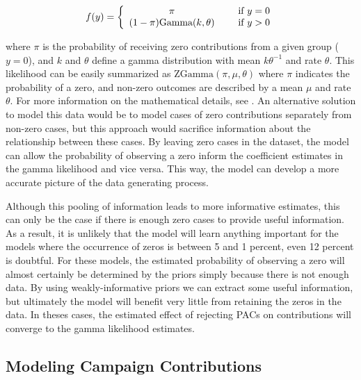 \documentclass[12pt]{article}
\begin{document}
  \begin{align}
f(y) = \left\{ \begin{array}{cc} 
                \pi & \hspace{5mm} \text{if $y = 0$} \\
                (1 - \pi) \text{Gamma}(k, \theta) & \hspace{5mm}  \text{if $y > 0$} \\
                \end{array} \right.
\end{align}

\noindent where $\pi$ is the probability of receiving zero contributions from a given group ($y = 0$), and $k$ and $\theta$ define a gamma distribution with mean $k\theta^{-1}$ and rate $\theta$. This likelihood can be easily summarized as $\text{ZGamma}(\pi, \mu, \theta)$ where $\pi$ indicates the probability of a zero, and non-zero outcomes are described by a mean $\mu$ and rate $\theta$. For more information on the mathematical details, see \citet{mccullagn_generalized_1989}. An alternative solution to model this data would be to model cases of zero contributions separately from non-zero cases, but this approach would sacrifice information about the relationship between these cases. By leaving zero cases in the dataset, the model can allow the probability of observing a zero inform the coefficient estimates in the gamma likelihood and vice versa. This way, the model can develop a more accurate picture of the data generating process.

Although this pooling of information leads to more informative estimates, this can only be the case if there is enough zero cases to provide useful information. As a result, it is unlikely that the model will learn anything important for the models where the occurrence of zeros is between 5 and 1 percent, even 12 percent is doubtful. For these models, the estimated probability of observing a zero will almost certainly be determined by the priors simply because there is not enough data. By using weakly-informative priors we can extract some useful information, but ultimately the model will benefit very little from retaining the zeros in the data. In theses cases, the estimated effect of rejecting PACs on contributions will converge to the gamma likelihood estimates. 

\subsection{Modeling Campaign Contributions}
\end{document}
